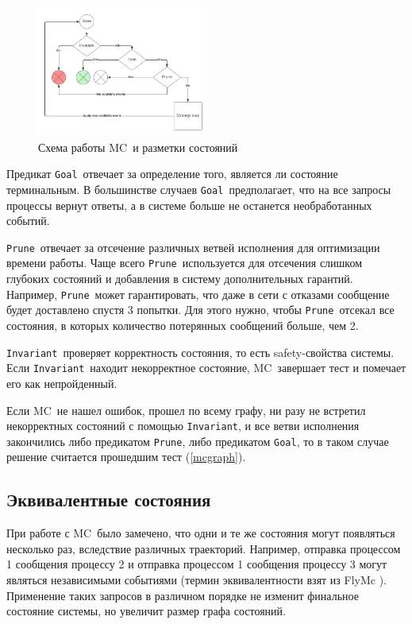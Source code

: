 \documentclass[a4paper,12pt]{extarticle}
\newcommand{\goal}[0]{\texttt{Goal}}
\newcommand{\prune}[0]{\texttt{Prune}}
\newcommand{\invariant}[0]{\texttt{Invariant}}
\newcommand{\mc}[0]{MC}
\begin{document}
\begin{figure}[H]
    \begin{center}
        \includegraphics[width=0.5\textwidth]{img/mc_diagram.png}
        \caption{Схема работы \mc\ и разметки состояний}
        \label{mcdiagram}
    \end{center}
\end{figure}

Предикат \goal\ отвечает за определение того, является ли состояние терминальным.
В большинстве случаев \goal\ предполагает, что на все запросы процессы вернут ответы, а в системе больше не останется необработанных событий.

\prune\ отвечает за отсечение различных ветвей исполнения для оптимизации времени работы.
Чаще всего \prune\ используется для отсечения слишком глубоких состояний и добавления в систему дополнительных гарантий.
Например, \prune\ может гарантировать, что даже в сети с отказами сообщение будет доставлено спустя 3 попытки.
Для этого нужно, чтобы \prune\ отсекал все состояния, в которых количество потерянных сообщений больше, чем 2.

\invariant\ проверяет корректность состояния, то есть safety-свойства системы.
Если \invariant\ находит некорректное состояние, \mc\ завершает тест и помечает его как непройденный.

Если \mc\ не нашел ошибок, прошел по всему графу, ни разу не встретил некорректных состояний с помощью \invariant, и все ветви исполнения закончились либо предикатом \prune, либо предикатом \goal, то в таком случае решение считается прошедшим тест (\cref{mcgraph}).



\subsection{Эквивалентные состояния}
\label{visitedstates}

При работе с \mc\ было замечено, что одни и те же состояния могут появляться несколько раз, вследствие различных траекторий.
Например, отправка процессом 1 сообщения процессу 2 и отправка процессом 1 сообщения процессу 3 могут являться независимыми событиями (термин эквивалентности взят из FlyMc \cite{b6}).
Применение таких запросов в различном порядке не изменит финальное состояние системы, но увеличит размер графа состояний.
\end{document}
